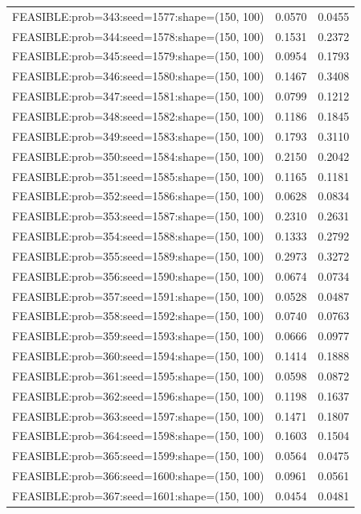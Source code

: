 \begin{longtable}{lcc}
FEASIBLE:prob=343:seed=1577:shape=(150, 100) &   0.0570 & 0.0455 \\
FEASIBLE:prob=344:seed=1578:shape=(150, 100) &   0.1531 & 0.2372 \\
FEASIBLE:prob=345:seed=1579:shape=(150, 100) &   0.0954 & 0.1793 \\
FEASIBLE:prob=346:seed=1580:shape=(150, 100) &   0.1467 & 0.3408 \\
FEASIBLE:prob=347:seed=1581:shape=(150, 100) &   0.0799 & 0.1212 \\
FEASIBLE:prob=348:seed=1582:shape=(150, 100) &   0.1186 & 0.1845 \\
FEASIBLE:prob=349:seed=1583:shape=(150, 100) &   0.1793 & 0.3110 \\
FEASIBLE:prob=350:seed=1584:shape=(150, 100) &   0.2150 & 0.2042 \\
FEASIBLE:prob=351:seed=1585:shape=(150, 100) &   0.1165 & 0.1181 \\
FEASIBLE:prob=352:seed=1586:shape=(150, 100) &   0.0628 & 0.0834 \\
FEASIBLE:prob=353:seed=1587:shape=(150, 100) &   0.2310 & 0.2631 \\
FEASIBLE:prob=354:seed=1588:shape=(150, 100) &   0.1333 & 0.2792 \\
FEASIBLE:prob=355:seed=1589:shape=(150, 100) &   0.2973 & 0.3272 \\
FEASIBLE:prob=356:seed=1590:shape=(150, 100) &   0.0674 & 0.0734 \\
FEASIBLE:prob=357:seed=1591:shape=(150, 100) &   0.0528 & 0.0487 \\
FEASIBLE:prob=358:seed=1592:shape=(150, 100) &   0.0740 & 0.0763 \\
FEASIBLE:prob=359:seed=1593:shape=(150, 100) &   0.0666 & 0.0977 \\
FEASIBLE:prob=360:seed=1594:shape=(150, 100) &   0.1414 & 0.1888 \\
FEASIBLE:prob=361:seed=1595:shape=(150, 100) &   0.0598 & 0.0872 \\
FEASIBLE:prob=362:seed=1596:shape=(150, 100) &   0.1198 & 0.1637 \\
FEASIBLE:prob=363:seed=1597:shape=(150, 100) &   0.1471 & 0.1807 \\
FEASIBLE:prob=364:seed=1598:shape=(150, 100) &   0.1603 & 0.1504 \\
FEASIBLE:prob=365:seed=1599:shape=(150, 100) &   0.0564 & 0.0475 \\
FEASIBLE:prob=366:seed=1600:shape=(150, 100) &   0.0961 & 0.0561 \\
FEASIBLE:prob=367:seed=1601:shape=(150, 100) &   0.0454 & 0.0481 \\

\end{longtable}
